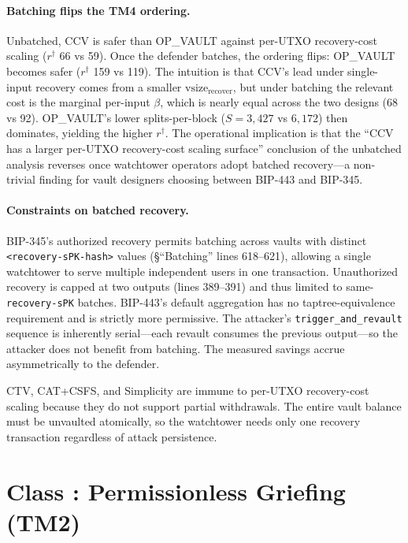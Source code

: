 \paragraph{Batching flips the TM4 ordering.}
Unbatched, CCV is safer than OP\_VAULT against per-UTXO recovery-cost scaling
($r^\dagger$ 66 vs 59). Once the defender batches, the ordering flips:
OP\_VAULT becomes safer ($r^\dagger$ 159 vs 119). The intuition is that
CCV's lead under single-input recovery comes from a smaller
$\text{vsize}_{\text{recover}}$, but under batching the relevant cost
is the marginal per-input $\beta$, which is nearly equal across the
two designs (68 vs 92\vB). OP\_VAULT's lower splits-per-block
($S = 3{,}427$ vs $6{,}172$) then dominates, yielding the higher
$r^\dagger$. The operational implication is that the
``CCV has a larger per-UTXO recovery-cost scaling surface'' conclusion of the
unbatched analysis reverses once watchtower operators adopt batched
recovery---a non-trivial finding for vault designers choosing between
BIP-443 and BIP-345.

\paragraph{Constraints on batched recovery.}
BIP-345's authorized recovery permits batching across vaults with
distinct \texttt{<recovery-sPK-hash>} values (§``Batching'' lines
618--621), allowing a single watchtower to serve multiple independent
users in one transaction. Unauthorized recovery is capped at two
outputs (lines 389--391) and thus limited to same-\texttt{recovery-sPK}
batches. BIP-443's default aggregation has no taptree-equivalence
requirement and is strictly more permissive. The attacker's
\texttt{trigger\_and\_revault} sequence is inherently serial---each
revault consumes the previous output---so the attacker does not
benefit from batching. The measured savings accrue asymmetrically to
the defender.

CTV, CAT+CSFS, and Simplicity are immune to per-UTXO recovery-cost scaling because they do
not support partial withdrawals. The entire vault balance must be unvaulted
atomically, so the watchtower needs only one recovery transaction regardless of
attack persistence.

\section{Class \classgrief{}: Permissionless Griefing (TM2)} \label{se:recovery_griefing}

